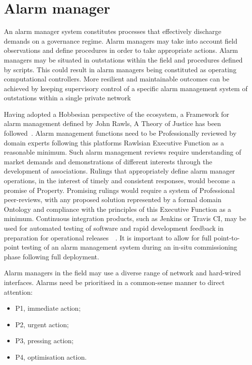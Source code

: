 \documentclass[11pt, oneside]{book}   	%
\begin{document}
\section{Alarm manager}
An alarm manager system constitutes processes that effectively discharge demands on a governance regime.
Alarm managers may take into account field observations and define procedures in order to take appropriate actions.
Alarm managers may be situated in outstations within the field and procedures defined by scripts.
This could result in alarm managers being constituted as operating computational controllers.
More resilient and maintainable outcomes can be achieved by keeping supervisory control of a specific alarm management system of outstations within a single private network\

Having adopted a Hobbesian perspective of the ecosystem, a Framework for alarm management defined by John Rawls, A Theory of Justice has been followed~\cite{jr1}.
Alarm management functions need to be Professionally reviewed by domain experts following this platforms Rawlsian Executive Function as a reasonable minimum.
Such alarm management reviews require understanding of market demands and demonstrations of different interests through the development of associations.
Rulings that appropriately define alarm manager operations, in the interest of timely and consistent responses, would become a promise of Property.
Promising rulings would require a system of Professional peer-reviews, with any proposed solution represented by a formal domain Ontology and compliance with the principles of this Executive Function as a minimum.
Continuous integration products, such as Jenkins or Travis CI, may be used for automated testing of software and rapid development feedback in preparation for operational releases~\cite{jenkins}~\cite{travis}.
It is important to allow for full point-to-point testing of an alarm management system during an in-situ commissioning phase following full deployment.\

Alarm managers in the field may use a diverse range of network and hard-wired interfaces.
Alarms need be prioritised in a common-sense manner to direct attention:
\begin{itemize}
	\item P1, immediate action; 
	\item P2, urgent action;
	\item P3, pressing action;
	\item P4, optimisation action.
\end{itemize}
\end{document}
